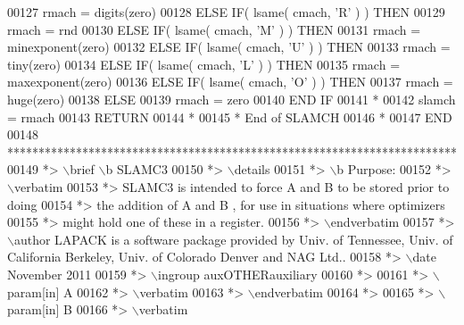 \begin{DoxyCode}
00127          rmach = digits(zero)
00128       \textcolor{keywordflow}{ELSE} \textcolor{keywordflow}{IF}( lsame( cmach, \textcolor{stringliteral}{'R'} ) ) \textcolor{keywordflow}{THEN}
00129          rmach = rnd
00130       \textcolor{keywordflow}{ELSE} \textcolor{keywordflow}{IF}( lsame( cmach, \textcolor{stringliteral}{'M'} ) ) \textcolor{keywordflow}{THEN}
00131          rmach = minexponent(zero)
00132       \textcolor{keywordflow}{ELSE} \textcolor{keywordflow}{IF}( lsame( cmach, \textcolor{stringliteral}{'U'} ) ) \textcolor{keywordflow}{THEN}
00133          rmach = tiny(zero)
00134       \textcolor{keywordflow}{ELSE} \textcolor{keywordflow}{IF}( lsame( cmach, \textcolor{stringliteral}{'L'} ) ) \textcolor{keywordflow}{THEN}
00135          rmach = maxexponent(zero)
00136       \textcolor{keywordflow}{ELSE} \textcolor{keywordflow}{IF}( lsame( cmach, \textcolor{stringliteral}{'O'} ) ) \textcolor{keywordflow}{THEN}
00137          rmach = huge(zero)
00138       \textcolor{keywordflow}{ELSE}
00139          rmach = zero
00140 \textcolor{keywordflow}{      END IF}
00141 \textcolor{comment}{*}
00142       slamch = rmach
00143       \textcolor{keywordflow}{RETURN}
00144 \textcolor{comment}{*}
00145 \textcolor{comment}{*     End of SLAMCH}
00146 \textcolor{comment}{*}
00147 \textcolor{keyword}{      END}
00148 \textcolor{comment}{************************************************************************}
00149 \textcolor{comment}{*> \(\backslash\)brief \(\backslash\)b SLAMC3}
00150 \textcolor{comment}{*> \(\backslash\)details}
00151 \textcolor{comment}{*> \(\backslash\)b Purpose:}
00152 \textcolor{comment}{*> \(\backslash\)verbatim}
00153 \textcolor{comment}{*> SLAMC3  is intended to force  A  and  B  to be stored prior to doing}
00154 \textcolor{comment}{*> the addition of  A  and  B ,  for use in situations where optimizers}
00155 \textcolor{comment}{*> might hold one of these in a register.}
00156 \textcolor{comment}{*> \(\backslash\)endverbatim}
00157 \textcolor{comment}{*> \(\backslash\)author LAPACK is a software package provided by Univ. of Tennessee, Univ. of California Berkeley, Univ.
       of Colorado Denver and NAG Ltd..}
00158 \textcolor{comment}{*> \(\backslash\)date November 2011}
00159 \textcolor{comment}{*> \(\backslash\)ingroup auxOTHERauxiliary}
00160 \textcolor{comment}{*>}
00161 \textcolor{comment}{*> \(\backslash\)param[in] A}
00162 \textcolor{comment}{*> \(\backslash\)verbatim}
00163 \textcolor{comment}{*> \(\backslash\)endverbatim}
00164 \textcolor{comment}{*>}
00165 \textcolor{comment}{*> \(\backslash\)param[in] B}
00166 \textcolor{comment}{*> \(\backslash\)verbatim}

\end{DoxyCode}
